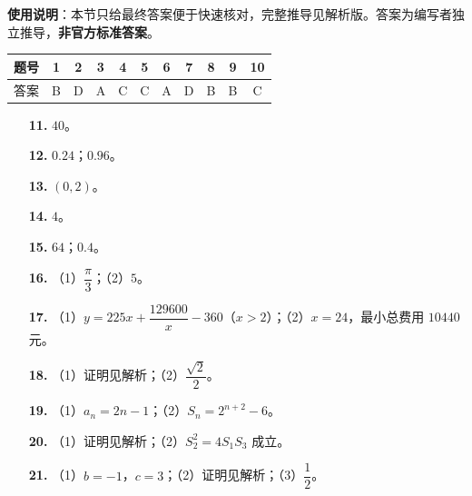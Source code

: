 
\begin{gknotice}
\textbf{使用说明}：本节只给最终答案便于快速核对，完整推导见解析版。答案为编写者独立推导，\textbf{非官方标准答案}。
\end{gknotice}

\begin{center}\begin{tabular}{ccccccccccc}
\toprule
题号 & 1 & 2 & 3 & 4 & 5 & 6 & 7 & 8 & 9 & 10 \\
\midrule
答案 & B & D & A & C & C & A & D & B & B & C \\
\bottomrule
\end{tabular}\end{center}

\begin{itemize}[leftmargin=2.6em]
  \item[\textbf{11.}] $40$。
  \item[\textbf{12.}] $0.24$；$0.96$。
  \item[\textbf{13.}] $(0,2)$。
  \item[\textbf{14.}] $4$。
  \item[\textbf{15.}] $64$；$0.4$。
\end{itemize}

\begin{itemize}[leftmargin=2.6em]
  \item[\textbf{16.}] （1）$\dfrac\pi3$；（2）$5$。
  \item[\textbf{17.}] （1）$y=225x+\dfrac{129600}{x}-360$（$x>2$）；（2）$x=24$，最小总费用 $10440$ 元。
  \item[\textbf{18.}] （1）证明见解析；（2）$\dfrac{\sqrt2}{2}$。
  \item[\textbf{19.}] （1）$a_n=2n-1$；（2）$S_n=2^{n+2}-6$。
  \item[\textbf{20.}] （1）证明见解析；（2）$S_2^2=4S_1S_3$ 成立。
  \item[\textbf{21.}] （1）$b=-1$，$c=3$；（2）证明见解析；（3）$\dfrac12$。
\end{itemize}

